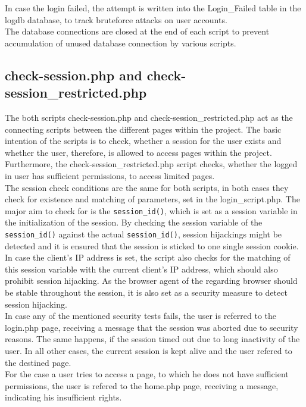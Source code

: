 In case the login failed, the attempt is written into the Login\_Failed table in the logdb database, to track bruteforce attacks on user accounts.\\
The database connections are closed at the end of each script to prevent accumulation of unused database connection by various scripts.

\subsection{check-session.php and check-session\_restricted.php}
The both scripts check-session.php and check-session\_restricted.php act as the connecting scripts between the different pages within the project. The basic intention of the scripts is to check, 
whether a session for the user exists and whether the user, therefore, is allowed to access pages within the project. Furthermore, the check-session\_restricted.php script checks, whether the logged 
in user has sufficient 
permissions, to access limited pages.\\ 
The session check conditions are the same for both scripts, in both cases they check for existence and matching of parameters, set in the login\_script.php. The major aim to check for is the 
\texttt{session\_id()}, which is set as a session variable in the initialization of the session. By checking the session variable of the \texttt{session\_id()} against the actual \texttt{session\_id()}, 
session hijackings might be detected and it is ensured that the session is sticked to one single session cookie. In case the client's IP address is set, the script also checks for the matching of this 
session variable with the current client's IP address, which should also prohibit session hijacking. As the browser agent of the regarding browser should be stable throughout the session, it is also 
set as a security measure to detect session hijacking.\\
In case any of the mentioned security tests fails, the user is referred to the login.php page, receiving a message that the session was aborted due to security reasons. The same happens, if the session 
timed out due to long inactivity of the user. In all other cases, the current session is kept alive and the user refered to the destined page.\\
For the case a user tries to access a page, to which he does not have sufficient permissions, the user is refered to the home.php page, receiving a message, indicating his insufficient rights.
